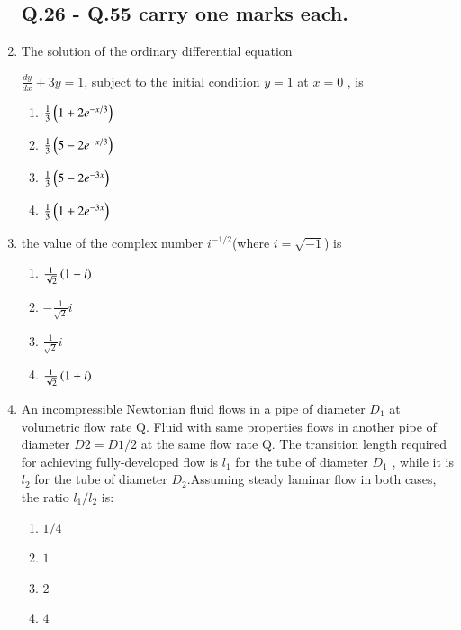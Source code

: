 \documentclass[journal]{IEEEtran}
\begin{document}
\begin{enumerate}
   \subsection*{\textbf{Q.26 - Q.55 carry one marks each.}}

    \item The solution of the ordinary differential equation
    
    $\frac{dy}{dx} + 3y = 1$, subject to the initial condition $y = 1$ at $x = 0$ , is 
    
\begin{multicols}{2}
    \begin{enumerate}
        \item $\frac{1}{3}\left(1 + 2e^{-x/3}\right)$
        \item $\frac{1}{3}\left(5 - 2e^{-x/3}\right)$
        \item $\frac{1}{3}\left(5 - 2e^{-3x}\right)$
        \item $\frac{1}{3}\left(1 + 2e^{-3x}\right)$
    \end{enumerate}
\end{multicols}

    \item the value of the complex number ${i}^{-1/2}$(where ${i} = \sqrt{-1}$) is

\begin{multicols}{4}
    \begin{enumerate}
    
    \item $\frac{1}{\sqrt{2}}\left(1 -\textit{i}\right)$
    \item $-\frac{1}{\sqrt{2}}\textit{i}$
    \item $\frac{1}{\sqrt{2}}\textit{i}$
    \item $\frac{1}{\sqrt{2}}\left(1+\textit{i}\right)$
    \end{enumerate}
\end{multicols}

    \item An incompressible Newtonian fluid flows in a pipe of diameter $D_1$ at volumetric flow rate Q. Fluid with same properties flows in another pipe of diameter $D2 = D1 / 2$ at the same flow rate Q. The transition length required for achieving fully-developed flow is $l_1$ for the tube of diameter $D_1$ , while it is $l_2$ for the tube of diameter $D_2$.Assuming steady laminar flow in both cases, the ratio $l_1/l_2$ is: 
    \begin{multicols}{4}
\begin{enumerate}
    \item $1/4$
    \item $1$
    \item $2$
    \item $4$
\end{enumerate}
\end{multicols}


\end{enumerate}
\end{document}
